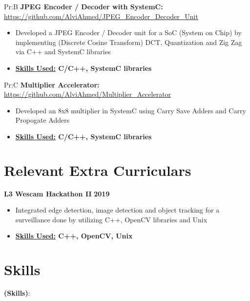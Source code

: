 \documentclass[11pt]{article}
\newcommand{\spaces}{1em}
\begin{document}
Pr:B
\textbf{JPEG Encoder / Decoder with SystemC: }
\underline{\url{https://github.com/AlviAhmed/JPEG_Encoder_Decoder_Unit}}
\begin{itemize}[noitemsep,nolistsep]
\item Developed a JPEG Encoder / Decoder unit for a SoC (System on Chip) by implementing
  (Discrete Cosine Transform) DCT, Quantization and Zig Zag via C++ and SystemC libraries
\item \textbf{\underline{Skills Used:} C/C++, SystemC libraries}
\end{itemize}



Pr:C
\textbf{Multiplier Accelerator: }
\underline{\url{https://github.com/AlviAhmed/Multiplier_Accelerator}}
\begin{itemize}[noitemsep,nolistsep]
\item Developed an 8x8 multiplier in SystemC using Carry Save Adders and Carry Propogate Adders
\item \textbf{\underline{Skills Used:} C/C++, SystemC libraries}
\end{itemize}


 
        \section*{Relevant Extra Curriculars}
            \textbf{L3 Wescam Hackathon II}  \hfill \textbf{2019}
            \begin{itemize}[noitemsep,nolistsep]
              \item Integrated edge detection, image detection and object tracking for a
                surveillance done by utilizing C++, OpenCV libraries and Unix
              \item \textbf{\underline{Skills Used:} C++, OpenCV, Unix}
	            \end{itemize}
                    \vspace{\spaces}
            

          \section*{Skills}

          \vspace{\spaces}

          \textbf{(Skills)}:
          
          \vspace{\spaces}
          


			                          
\end{document}
